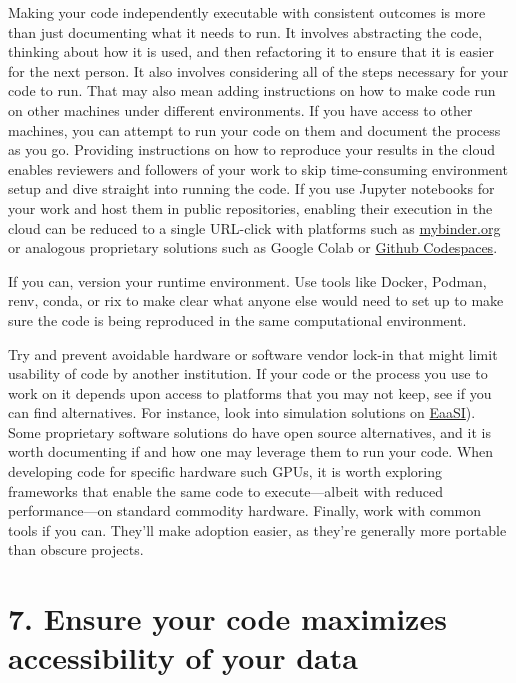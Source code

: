 \documentclass[10pt,letterpaper]{article}
\begin{document}
Making your code independently executable with consistent outcomes
is more than just documenting what it needs to run.
It involves abstracting the code,
thinking about how it is used,
and then refactoring it to ensure that it is easier for the next person.
It also involves considering all of the steps necessary for your code to run.
That may also mean adding instructions on how to make code run on other machines under different environments.
If you have access to other machines,
you can attempt to run your code on them
and document the process as you go.
Providing instructions on how to reproduce your results in the cloud
enables reviewers and followers of your work to skip time-consuming environment setup
and dive straight into running the code.
If you use Jupyter notebooks for your work \cite{Perkel2018}
and host them in public repositories,
enabling their execution in the cloud can be reduced to a single URL-click
with platforms such as \href{http://mybinder.org}{mybinder.org}
or analogous proprietary solutions such as Google Colab
or \href{https://github.com/features/codespaces}{Github Codespaces}.

If you can, version your runtime environment.
Use tools like Docker, Podman, renv, conda, or rix to make clear
what anyone else would need to set up
to make sure the code is being reproduced in the same computational environment.

Try and prevent avoidable hardware or software vendor lock-in
that might limit usability of code by another institution.
If your code or the process you use to work on it
depends upon access to platforms that you may not keep,
see if you can find alternatives.
For instance,
look into simulation solutions on
\href{https://www.softwarepreservationnetwork.org/emulation-as-a-service-infrastructure/}{EaaSI}).
Some proprietary software solutions do have open source alternatives,
and it is worth documenting if and how one may leverage them to run your code.
When developing code for specific hardware such GPUs,
it is worth exploring frameworks that enable the same code to execute---albeit
with reduced performance---on standard commodity hardware.
Finally,
work with common tools if you can.
They'll make adoption easier,
as they're generally more portable than obscure projects.

\section*{7. Ensure your code maximizes accessibility of your data}
\end{document}

